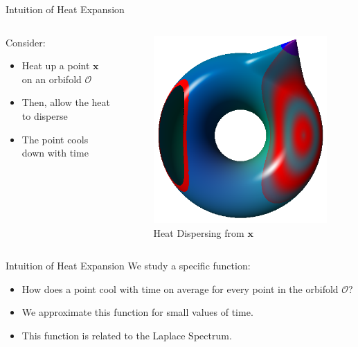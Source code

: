 \documentclass[12pt]{beamer}
\begin{document}
\begin{frame}{Intuition of Heat Expansion}
    \begin{columns}[c]
        \begin{column}{0.46\textwidth}
    Consider:
    \begin{itemize}
        \item Heat up a point $\mathbf{x}$ on an orbifold $\mathcal{O}$
        \item Then, allow the heat to disperse
        \item The point cools down with time
    \end{itemize}
\end{column}
\begin{column}[c]{0.53\textwidth}
    \begin{figure}
        \includegraphics[width=\textwidth]{images/heat_ex.png}
        \caption{Heat Dispersing from $\mathbf{x}$}
    \end{figure}
\end{column}
\end{columns}
\end{frame}

\begin{frame}{Intuition of Heat Expansion}
    We study a specific function:
    \begin{itemize}
        \item How does a point cool with time on average for every point in
            the orbifold $\mathcal{O}$?
        \item We approximate this function for small values of time.
        \item This function is related to the Laplace Spectrum.
    \end{itemize}
\end{frame}
\end{document}
